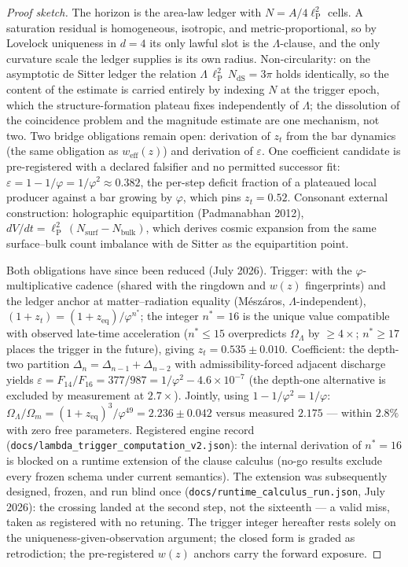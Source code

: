 \documentclass[11pt]{article}
\theoremstyle{plain}
\theoremstyle{definition}
\theoremstyle{remark}
\newenvironment{proofsketch}{\begin{proof}[Proof sketch]}{\end{proof}}
\begin{document}
\begin{proofsketch}
The horizon is the area-law ledger with \(N=A/4\ell_{\mathrm{P}}^2\) cells. A saturation residual is homogeneous, isotropic, and metric-proportional, so by Lovelock uniqueness in \(d=4\) its only lawful slot is the \(\Lambda\)-clause, and the only curvature scale the ledger supplies is its own radius. Non-circularity: on the asymptotic de Sitter ledger the relation \(\Lambda\,\ell_{\mathrm{P}}^2\,N_{\mathrm{dS}}=3\pi\) holds identically, so the content of the estimate is carried entirely by indexing \(N\) at the trigger epoch, which the structure-formation plateau fixes independently of \(\Lambda\); the dissolution of the coincidence problem and the magnitude estimate are one mechanism, not two. Two bridge obligations remain open: derivation of \(z_t\) from the bar dynamics (the same obligation as \(w_{\mathrm{eff}}(z)\)) and derivation of \(\varepsilon\). One coefficient candidate is pre-registered with a declared falsifier and no permitted successor fit: \(\varepsilon=1-1/\varphi=1/\varphi^2\approx 0.382\), the per-step deficit fraction of a plateaued local producer against a bar growing by \(\varphi\), which pins \(z_t=0.52\). Consonant external construction: holographic equipartition (Padmanabhan 2012), \(dV/dt=\ell_{\mathrm{P}}^2\,(N_{\mathrm{surf}}-N_{\mathrm{bulk}})\), which derives cosmic expansion from the same surface--bulk count imbalance with de Sitter as the equipartition point.

Both obligations have since been reduced (July 2026). Trigger: with the \(\varphi\)-multiplicative cadence (shared with the ringdown and \(w(z)\) fingerprints) and the ledger anchor at matter--radiation equality (M\'esz\'aros, \(\Lambda\)-independent), \((1+z_t) = (1+z_{\mathrm{eq}})/\varphi^{n^*}\); the integer \(n^* = 16\) is the unique value compatible with observed late-time acceleration (\(n^* \le 15\) overpredicts \(\Omega_\Lambda\) by \(\ge 4\times\); \(n^* \ge 17\) places the trigger in the future), giving \(z_t = 0.535 \pm 0.010\). Coefficient: the depth-two partition \(\Delta_n = \Delta_{n-1} + \Delta_{n-2}\) with admissibility-forced adjacent discharge yields \(\varepsilon = F_{14}/F_{16} = 377/987 = 1/\varphi^2 - 4.6\times 10^{-7}\) (the depth-one alternative is excluded by measurement at \(2.7\times\)). Jointly, using \(1 - 1/\varphi^2 = 1/\varphi\): \(\Omega_\Lambda/\Omega_m = (1+z_{\mathrm{eq}})^3/\varphi^{49} = 2.236 \pm 0.042\) versus measured \(2.175\) --- within \(2.8\%\) with zero free parameters. Registered engine record (\texttt{docs/lambda\_trigger\_computation\_v2.json}): the internal derivation of \(n^* = 16\) is blocked on a runtime extension of the clause calculus (no-go results exclude every frozen schema under current semantics). The extension was subsequently designed, frozen, and run blind once (\texttt{docs/runtime\_calculus\_run.json}, July 2026): the crossing landed at the second step, not the sixteenth --- a valid miss, taken as registered with no retuning. The trigger integer hereafter rests solely on the uniqueness-given-observation argument; the closed form is graded as retrodiction; the pre-registered \(w(z)\) anchors carry the forward exposure.
\end{proofsketch}
\end{document}
